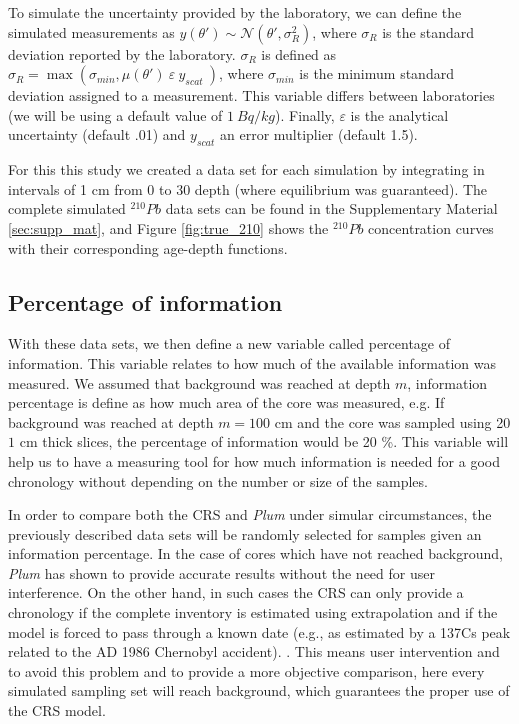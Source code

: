 \documentclass [10pt] {article}
\begin{document}
	To simulate the uncertainty provided by the laboratory, we can define the simulated measurements as  $y(\theta')\sim\mathcal{N}\left(\theta',\sigma_R^2\right)$, where $\sigma_R$ is the standard deviation reported by the laboratory. 
$\sigma_R$ is defined as $\sigma_R= \max \left(\sigma_{min}, \mu(\theta')~\varepsilon~y_{scat}~\right)$, where $\sigma_{min}$ is the minimum standard deviation assigned to a measurement. This variable differs between laboratories (we will be using a default value of $1~ Bq/kg$). 
Finally, $\varepsilon$ is the analytical uncertainty (default .01) and $y_{scat}$ an error multiplier (default 1.5).

	For this this study we created a data set for each simulation by integrating in intervals of 1 cm from 0 to 30 depth (where equilibrium was guaranteed).
The complete simulated $^{210}Pb$ data sets can be found in the Supplementary Material \ref{sec:supp_mat}, and Figure \ref{fig:true_210} shows the $^{210}Pb$ concentration curves with their corresponding age-depth functions. 

\subsection{Percentage of information}

	With these data sets, we then define a new variable called percentage of information. 
This variable relates to how much of the available information was measured. 
We assumed that background was reached at depth $m$, information percentage is define as how much area of the core was measured, e.g. 
If background was reached at depth $m=100$ cm and the core was sampled using 20 $1$ cm thick slices, the percentage of information would be 20 \%. 
This variable will help us to have a measuring tool for how much information is needed for a good chronology without depending on the number or size of the samples. 

In order to compare both the CRS and \textit{Plum} under simular circumstances, the previously described data sets will be randomly selected for samples given an information percentage. 
In the case of cores which have not reached background, \textit{Plum} \citep{Aquino2018} has shown to provide accurate results without the need for user interference. 
On the other hand, in such cases the CRS can only provide a chronology if the complete inventory is estimated using extrapolation and if the model is forced to pass through a known date (e.g., as estimated by a 137Cs peak related to the AD 1986 Chernobyl accident). .
This means user intervention and to avoid this problem and to provide a more objective comparison, here every simulated sampling set will reach background, which guarantees the proper use of the CRS model. 
\end{document}
